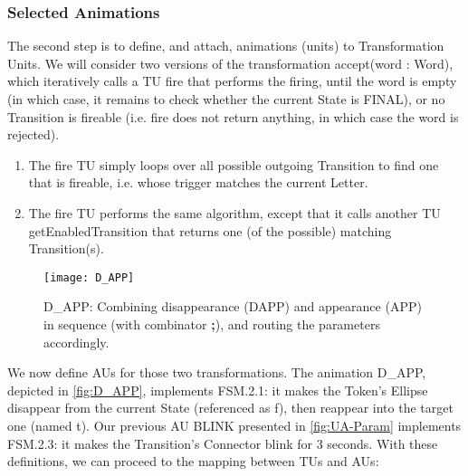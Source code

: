 \subsubsection{Selected Animations}
\label{sec:Proposal-FSM-ANIM}

The second step is to define, and attach, animations (units) to Transformation 
Units. We will consider two versions of the transformation \textsf{accept(word :
Word)}, which iteratively calls a TU \textsf{fire} that performs the firing, 
until the \textsf{word} is empty (in which case, it remains to check whether 
the current \textsf{State} is \textsf{FINAL}), or no \textsf{Transition} is 
fireable (i.e. \textsf{fire} does not return anything, in which case the 
\textsf{word} is rejected).
\begin{enumerate}
	\item The \textsf{fire} TU simply loops over all possible outgoing \textsf{Transition}
   to find one that is fireable, i.e. whose \textsf{trigger} matches the current \textsf{Letter}.
   
   \item The \textsf{fire} TU performs the same algorithm, except that it calls
   another TU \textsf{getEnabledTransition} that returns one (of the possible) matching
   \textsf{Transition}(s).
\end{enumerate}

\begin{figure}[t]%
   \centering
   \texttt{[image: D\_APP]}%
   \caption{\textsf{D\_APP}: Combining disappearance (\textsf{DAPP}) and appearance
   (\textsf{APP}) in sequence (with combinator \textbf{\textsf{;}}), and routing
   the parameters accordingly.}%
   \label{fig:D_APP}%
\end{figure}

We now define AUs for those two transformations. The animation \textsf{D\_APP},
depicted in \autoref{fig:D_APP}, implements \textsf{FSM.2.1}: it makes the 
\textsf{Token}'s \textsf{Ellipse} disappear from the current \textsf{State} 
(referenced as \textsf{f}), then reappear into the target one (named \textsf{t}). 
Our previous AU \textsf{BLINK} presented in \autoref{fig:UA-Param} implements 
\textsf{FSM.2.3}: it makes the \textsf{Transition}'s \textsf{Connector} blink 
for 3 seconds. 
With these definitions, we can proceed to the mapping between TUs and AUs:

